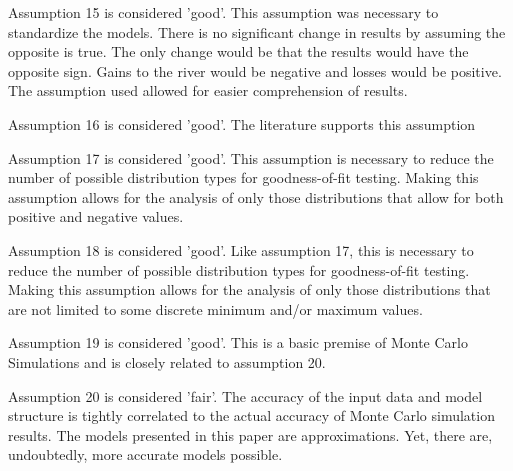 \begin{linenumbers}[1]
Assumption 15 is considered 'good'.  This assumption was necessary to standardize the models.  There is no significant change in results by assuming the opposite is true.  The only change would be that the results would have the opposite sign.  Gains to the river would be negative and losses would be positive.  The assumption used allowed for easier comprehension of results.

Assumption 16 is considered 'good'.  The literature supports this assumption %

Assumption 17 is considered 'good'.  This assumption is necessary to reduce the number of possible distribution types for goodness-of-fit testing.  Making this assumption allows for the analysis of only those distributions that allow for both positive and negative values.

Assumption 18 is considered 'good'.  Like assumption 17, this is necessary to reduce the number of possible distribution types for goodness-of-fit testing.  Making this assumption allows for the analysis of only those distributions that are not limited to some discrete minimum and/or maximum values.

Assumption 19 is considered 'good'.  This is a basic premise of Monte Carlo Simulations and is closely related to assumption 20.

Assumption 20 is considered 'fair'.  The accuracy of the input data and model structure is tightly correlated to the actual accuracy of Monte Carlo simulation results.  The models presented in this paper are approximations.  Yet, there are, undoubtedly, more accurate models possible.


\end{linenumbers}
